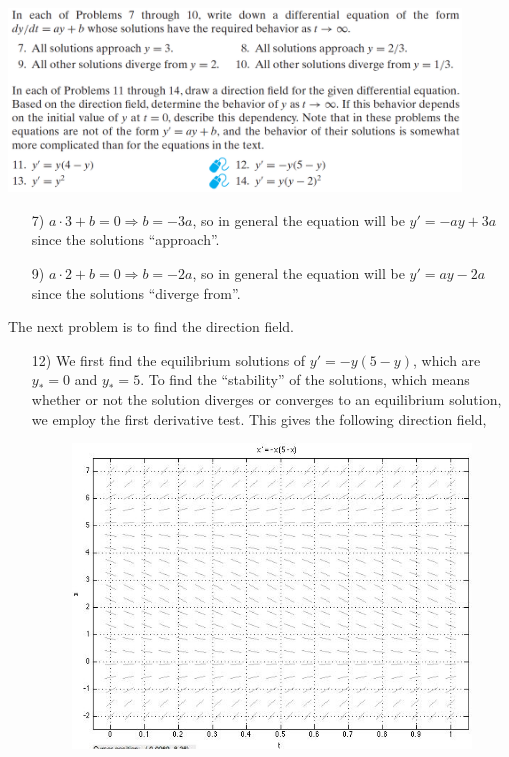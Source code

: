 \documentclass[reqno]{amsart}
\theoremstyle{definition}
\begin{document}
\includegraphics[width = 0.9\textwidth]{BoyceDiPrima_pg9_Ex7to14}

\begin{enumerate}

\item[7)]  $a\cdot 3 + b = 0 \Rightarrow b = -3a$, so in general the equation
will be $y' = -ay + 3a$ since the solutions ``approach''.

\item[9)]  $a\cdot 2 + b = 0 \Rightarrow b = -2a$, so in general the equation
will be $y' = ay - 2a$ since the solutions ``diverge from''.

\end{enumerate}

\bigskip

The next problem is to find the direction field.

\begin{enumerate}

\item[12)]  We first find the equilibrium solutions of $y' = -y(5-y)$, which are
$y_* = 0$ and $y_* = 5$.  To find the ``stability'' of the solutions, which means
whether or not the solution diverges or converges to an equilibrium solution,
we employ the first derivative test.  This gives the following direction field,

\begin{figure}[htbp]
\includegraphics[scale=.42]{DF2.jpg}
\end{figure}

\end{enumerate}
\end{document}
